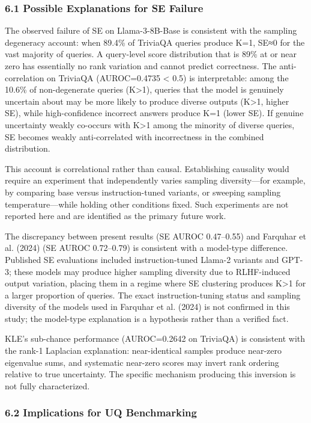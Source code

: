 
\subsubsection{6.1 Possible Explanations for SE Failure}

The observed failure of SE on Llama-3-8B-Base is consistent with the sampling degeneracy account: when 89.4\% of TriviaQA queries produce K=1, SE≈0 for the vast majority of queries. A query-level score distribution that is 89\% at or near zero has essentially no rank variation and cannot predict correctness. The anti-correlation on TriviaQA (AUROC=0.4735 < 0.5) is interpretable: among the 10.6\% of non-degenerate queries (K>1), queries that the model is genuinely uncertain about may be more likely to produce diverse outputs (K>1, higher SE), while high-confidence incorrect answers produce K=1 (lower SE). If genuine uncertainty weakly co-occurs with K>1 among the minority of diverse queries, SE becomes weakly anti-correlated with incorrectness in the combined distribution.

This account is correlational rather than causal. Establishing causality would require an experiment that independently varies sampling diversity—for example, by comparing base versus instruction-tuned variants, or sweeping sampling temperature—while holding other conditions fixed. Such experiments are not reported here and are identified as the primary future work.

The discrepancy between present results (SE AUROC 0.47–0.55) and Farquhar et al. (2024) (SE AUROC 0.72–0.79) is consistent with a model-type difference. Published SE evaluations included instruction-tuned Llama-2 variants and GPT-3; these models may produce higher sampling diversity due to RLHF-induced output variation, placing them in a regime where SE clustering produces K>1 for a larger proportion of queries. The exact instruction-tuning status and sampling diversity of the models used in Farquhar et al. (2024) is not confirmed in this study; the model-type explanation is a hypothesis rather than a verified fact.

KLE's sub-chance performance (AUROC=0.2642 on TriviaQA) is consistent with the rank-1 Laplacian explanation: near-identical samples produce near-zero eigenvalue sums, and systematic near-zero scores may invert rank ordering relative to true uncertainty. The specific mechanism producing this inversion is not fully characterized.

\subsubsection{6.2 Implications for UQ Benchmarking}

